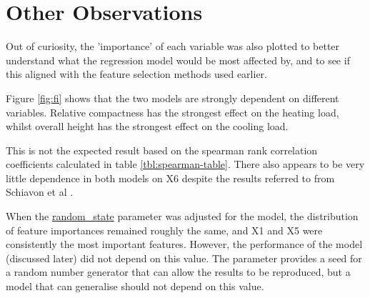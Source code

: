 \documentclass[12pt]{article}
\begin{document}
\section{Other Observations}

Out of curiosity, the 'importance' of each variable was also plotted to better understand what the regression model would be most affected by, and to see if this aligned with the feature selection methods used earlier.

Figure \ref{fig:fi} shows that the two models are strongly dependent on different variables. Relative compactness has the strongest effect on the heating load, whilst overall height has the strongest effect on the cooling load.

This is not the expected result based on the spearman rank correlation coefficients calculated in table \ref{tbl:spearman-table}. There also appears to be very little dependence in both models on X6 despite the results referred to from Schiavon et al \cite{schiavon_lee_bauman_webster_2010}.

When the \url{random_state} parameter was adjusted for the model, the distribution of feature importances remained roughly the same, and X1 and X5 were consistently the most important features. However, the performance of the model (discussed later) did not depend on this value. The parameter provides a seed for a random number generator that can allow the results to be reproduced, but a model that can generalise should not depend on this value.
\end{document}
